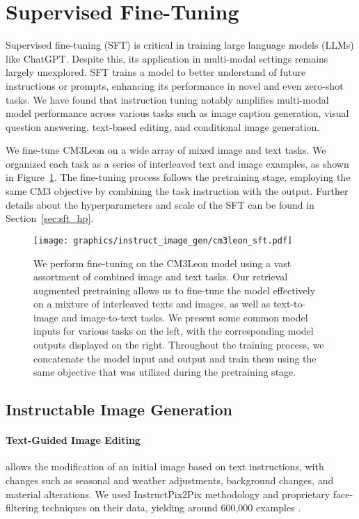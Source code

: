 \documentclass{article}
\newcommand{\model}{CM3Leon}
\newcommand{\mm}{multi-modal}
\begin{document}
\section{Supervised Fine-Tuning}
Supervised fine-tuning (SFT) is critical in training large language models (LLMs) like ChatGPT. Despite this, its application in \mm{} settings remains largely unexplored. SFT trains a model to better understand of future instructions or prompts, enhancing its performance in novel and even zero-shot tasks. We have found that instruction tuning notably amplifies \mm{} model performance across various tasks such as image caption generation, visual question answering, text-based editing, and conditional image generation. 


We fine-tune \model{} on a wide array of mixed image and text tasks. We organized each task as a series of interleaved text and image examples, as shown in Figure~\ref{fig:sft}. 
The fine-tuning process follows the pretraining stage, employing the same CM3 objective by combining the task instruction with the output. Further details about the hyperparameters and scale of the SFT can be found in Section~\ref{sec:sft_hp}.

\begin{figure}
    \centering
    \texttt{[image: graphics/instruct\_image\_gen/cm3leon\_sft.pdf]}
    \caption{We perform fine-tuning on the \model{} model using a vast assortment of combined image and text tasks. Our retrieval augmented pretraining allows us to fine-tune the model effectively on a mixture of interleaved texts and images, as well as text-to-image and image-to-text tasks. We present some common model inputs for various tasks on the left, with the corresponding model outputs displayed on the right. Throughout the training process, we concatenate the model input and output and train them using the same objective that was utilized during the pretraining stage.}
    \label{fig:sft}
\end{figure}

\subsection{Instructable Image Generation}
\paragraph{Text-Guided Image Editing} allows the modification of an initial image based on text instructions, with changes such as seasonal and weather adjustments, background changes, and material alterations. We used InstructPix2Pix methodology and proprietary face-filtering techniques on their data, yielding around 600,000 examples \citep{instructpix2pix}.
\end{document}
